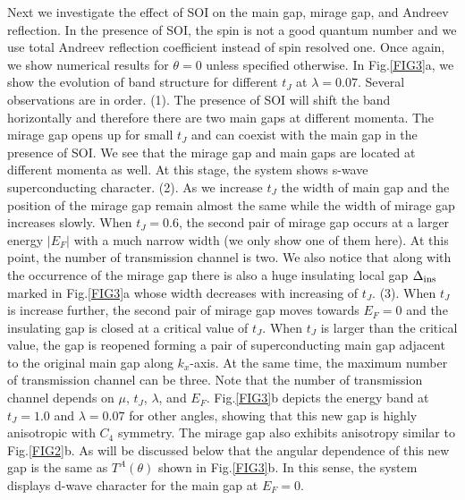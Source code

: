 \documentclass[aps, prb, twocolumn, amssymb, amsmath, showpacs, superscriptaddress]{revtex4-1}
\begin{document}
Next we investigate the effect of SOI on the main gap, mirage gap, and Andreev reflection. In the presence of SOI, the spin is not a good quantum number and we use total Andreev reflection coefficient instead of spin resolved one. Once again, we show numerical results for $\theta=0$ unless specified otherwise. In Fig.\ref{FIG3}a, we show the evolution of band structure for different $t_J$ at $\lambda=0.07$. Several observations are in order. (1). The presence of SOI will shift the band horizontally and therefore there are two main gaps at different momenta.
The mirage gap opens up for small $t_J$ and can coexist with the main gap in the presence of SOI. We see that the mirage gap and main gaps are located at different momenta as well. At this stage, the system shows s-wave superconducting character.
(2). As we increase $t_J$ the width of main gap and the position of the mirage gap remain almost the same while the width of mirage gap increases slowly. When $t_J=0.6$, the second pair of mirage gap occurs at a larger energy $|E_F|$ with a much narrow width (we only show one of them here). At this point, the number of transmission channel is two. We also notice that along with the occurrence of the mirage gap there is also a huge insulating local gap $\Delta_{\rm ins}$ marked in Fig.\ref{FIG3}a whose width decreases with increasing of $t_J$.
(3). When $t_J$ is increase further, the second pair of mirage gap moves towards $E_F=0$ and the insulating gap is closed at a critical value of $t_J$. When $t_J$ is larger than the critical value, the gap is reopened forming a pair of superconducting main gap adjacent to the original main gap along $k_x$-axis. At the same time, the maximum number of transmission channel can be three. Note that the number of transmission channel depends on $\mu$, $t_J$, $\lambda$, and $E_F$.
Fig.\ref{FIG3}b depicts the energy band at $t_J=1.0$ and $\lambda=0.07$ for other angles, showing that this new gap is highly anisotropic with $C_4$ symmetry. The mirage gap also exhibits anisotropy similar to Fig.\ref{FIG2}b. As will be discussed below that the angular dependence of this new gap is the same as $T^A(\theta)$ shown in Fig.\ref{FIG3}b. In this sense, the system displays d-wave character for the main gap at $E_F=0$.
\end{document}
